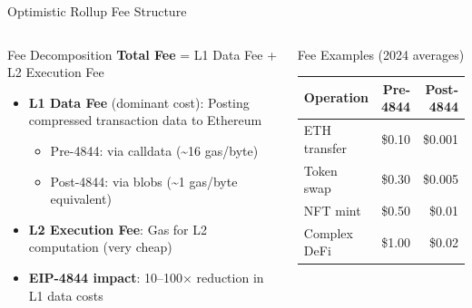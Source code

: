 \documentclass[8pt,aspectratio=169]{beamer}
\begin{document}
\begin{frame}{Optimistic Rollup Fee Structure}
\vspace{-1mm}
\begin{columns}[T]
\begin{block}{Fee Decomposition}
\footnotesize
\textbf{Total Fee} = L1 Data Fee + L2 Execution Fee
\begin{itemize}
  \item \textbf{L1 Data Fee} (dominant cost): Posting compressed transaction data to Ethereum
    \begin{itemize}\scriptsize
      \item Pre-4844: via calldata (\textasciitilde16 gas/byte)
      \item Post-4844: via blobs (\textasciitilde1 gas/byte equivalent)
    \end{itemize}
  \item \textbf{L2 Execution Fee}: Gas for L2 computation (very cheap)
  \item \textbf{EIP-4844 impact}: 10--100$\times$ reduction in L1 data costs
\end{itemize}
\end{block}
\vspace{2mm}
\begin{block}{Fee Examples (2024 averages)}
\footnotesize
\begin{tabular}{lrr}
\toprule
Operation & Pre-4844 & Post-4844 \\
\midrule
ETH transfer & \$0.10 & \$0.001 \\
Token swap & \$0.30 & \$0.005 \\
NFT mint & \$0.50 & \$0.01 \\
Complex DeFi & \$1.00 & \$0.02 \\
\bottomrule
\end{tabular}
\end{block}
\vspace{1mm}
\end{columns}
\end{frame}
\end{document}

